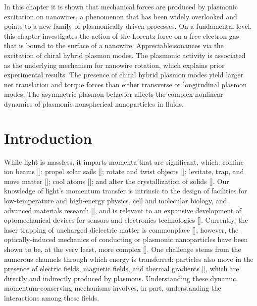 In this chapter it is shown that mechanical forces are produced by plasmonic excitation on nanowires, a phenomenon that has been widely overlooked and points to a new family of plasmonically-driven processes. On a fundamental level, this chapter investigates the action of the Lorentz force on a free electron gas that is bound to the surface of a nanowire. Appreciableisonances via the excitation of chiral hybrid plasmon modes. The plasmonic activity is associated as the underlying mechanism for nanowire rotation, which explains prior experimental results. The presence of chiral hybrid plasmon modes yield larger net translation and torque forces than either transverse or longitudinal plasmon modes. The asymmetric plasmon behavior affects the complex nonlinear dynamics of plasmonic nonspherical nanoparticles in fluids.

\section{Introduction}
While light is massless, it imparts momenta that are significant, which: confine ion beams [\cite{Petrich1993}]; propel solar sails [\cite{Janhunen2007}]; rotate and twist objects [\cite{Beth1936, Paterson2001, Tsai2014}]; levitate, trap, and move matter [\cite{Laboratories1997, NieminenRev, Novotny1997}]; cool atoms [\cite{Weiner1999}]; and alter the crystallization of solids [\cite{Chowdhury1985}]. Our knowledge of light's momentum transfer is intrinsic to the design of facilities for low-temperature and high-energy physics, cell and molecular biology, and advanced materials research [\cite{Laboratories1997}], and is relevant to an expansive development of optomechanical devices for sensors and electronics technologies [\cite{Hugel2002, Kippenberg2007, Thourhout2010}].  Currently, the laser trapping of uncharged dielectric matter is commonplace [\cite{Laboratories1997}]; however, the optically-induced mechanics of conducting or plasmonic nanoparticles have been shown to be, at the very least, more complex [\cite{Dienerowitz2008, Saija2009, Shvedov2010, Yan2012, Yan2012a, Yan2013, Yan2013a, Yan2013b}]. One challenge stems from the numerous channels through which energy is transferred: particles also move in the presence of electric fields, magnetic fields, and thermal gradients [\cite{Bhatt, Keshoju, Edwards2006}], which are directly and indirectly produced by plasmons.  Understanding these dynamic, momentum-conserving mechanisms involves, in part, understanding the interactions among these fields.



